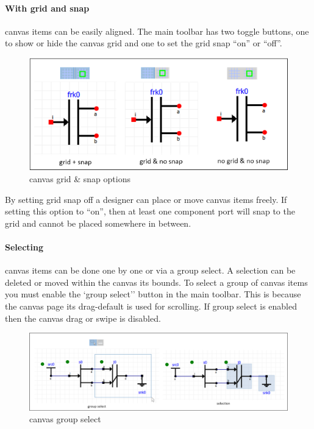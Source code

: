 \paragraph{With grid and snap}canvas items can be easily aligned. The main
toolbar has two toggle buttons, one to show or hide the canvas grid and one to
set the grid snap ``on'' or ``off''. 

\begin{figure}[here]
\begin{center}	
	\includegraphics[width=.70\linewidth]{pictures/canvas-grid}
	\caption{canvas grid \& snap options}
	\label{fig:canvas-grid}
\end{center}
\end{figure}

By setting grid snap off a designer can place or move canvas items freely. If
setting this option to ``on'', then at least one component port will snap to the
grid and cannot be placed somewhere in between.

\paragraph{Selecting}canvas items can be done one by one or via a group select.
A selection can be deleted or moved within the canvas its bounds. To select a
group of canvas items you must enable the `group select'' button in the main
toolbar. This is because the canvas page its drag-default is used for scrolling.
If group select is enabled then the canvas drag or swipe is disabled.

\begin{figure}[here]
\begin{center}	
	\includegraphics[width=.70\linewidth]{pictures/canvas-selection}
	\caption{canvas group select}
	\label{fig:canvas-selection}
\end{center}
\end{figure}

